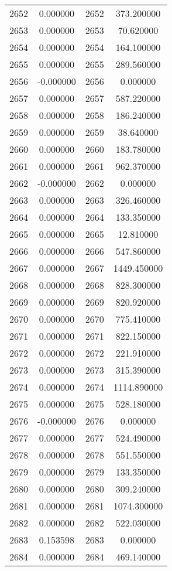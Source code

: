 \documentclass[12pt]{article}
\begin{document}
\begin{longtable}{@{}cccc@{}}
2652 & 0.000000 & 2652 & 373.200000 \\
2653 & 0.000000 & 2653 & 70.620000 \\
2654 & 0.000000 & 2654 & 164.100000 \\
2655 & 0.000000 & 2655 & 289.560000 \\
2656 & -0.000000 & 2656 & 0.000000 \\
2657 & 0.000000 & 2657 & 587.220000 \\
2658 & 0.000000 & 2658 & 186.240000 \\
2659 & 0.000000 & 2659 & 38.640000 \\
2660 & 0.000000 & 2660 & 183.780000 \\
2661 & 0.000000 & 2661 & 962.370000 \\
2662 & -0.000000 & 2662 & 0.000000 \\
2663 & 0.000000 & 2663 & 326.460000 \\
2664 & 0.000000 & 2664 & 133.350000 \\
2665 & 0.000000 & 2665 & 12.810000 \\
2666 & 0.000000 & 2666 & 547.860000 \\
2667 & 0.000000 & 2667 & 1449.450000 \\
2668 & 0.000000 & 2668 & 828.300000 \\
2669 & 0.000000 & 2669 & 820.920000 \\
2670 & 0.000000 & 2670 & 775.410000 \\
2671 & 0.000000 & 2671 & 822.150000 \\
2672 & 0.000000 & 2672 & 221.910000 \\
2673 & 0.000000 & 2673 & 315.390000 \\
2674 & 0.000000 & 2674 & 1114.890000 \\
2675 & 0.000000 & 2675 & 528.180000 \\
2676 & -0.000000 & 2676 & 0.000000 \\
2677 & 0.000000 & 2677 & 524.490000 \\
2678 & 0.000000 & 2678 & 551.550000 \\
2679 & 0.000000 & 2679 & 133.350000 \\
2680 & 0.000000 & 2680 & 309.240000 \\
2681 & 0.000000 & 2681 & 1074.300000 \\
2682 & 0.000000 & 2682 & 522.030000 \\
2683 & 0.153598 & 2683 & 0.000000 \\
2684 & 0.000000 & 2684 & 469.140000 \\

\end{longtable}
\end{document}
